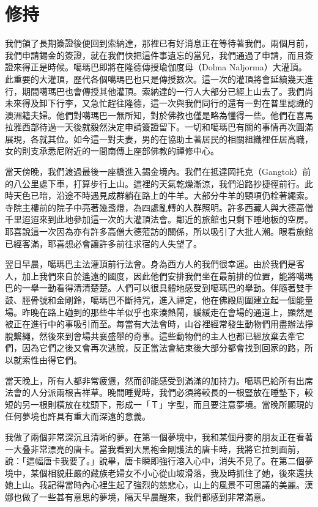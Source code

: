 \chapter{修持}

我們領了長期簽證後便回到索納達，那裡已有好消息正在等待著我們。兩個月前，我們申請錫金的簽證，就在我們快把這件事遺忘的當兒，我們通過了申請，而且簽證來得正是時候。噶瑪巴即將在隆德傳授瑜伽度母（Dolma
Naljorma）大灌頂。此重要的大灌頂，歷代各個噶瑪巴也只是傳授數次。這一次的灌頂將會延續幾天進行，期間噶瑪巴也會傳授其他灌頂。索納達的一行人大部分已經上山去了。我們尚未來得及卸下行李，又急忙趕往隆德，這一次與我們同行的還有一對在普里認識的澳洲籍夫婦。他們對噶瑪巴一無所知，對於佛教也僅是略為懂得一些。他們在喜馬拉雅西部待過一天後就毅然決定申請簽證留下。一切和噶瑪巴有關的事情再次圓滿展現，各就其位。如今這一對夫妻，男的在協助土著居民的相關組織裡任居高職，女的則支承悉尼附近的一間南傳上座部佛教的禪修中心。

當天傍晚，我們渡過最後一座橋進入錫金境內。我們在抵達岡托克（Gangtok）前的八公里處下車，打算步行上山。這裡的天氣乾燥漸涼，我們沿路抄捷徑前行。此時天色已暗，沿途不時遇見成群躺在路上的牛羊。大部分牛羊的頸項仍栓著繩索。寺院主樓前的院子中亮著幾盞燈，為四處亂轉的人群照明。許多西藏人與大德高僧千里迢迢來到此地參加這一次的大灌頂法會。鄰近的旅館也只剩下睡地板的空房。耶喜說這一次因為亦有許多高僧大德蒞訪的關係，所以吸引了大批人潮。眼看旅館已經客滿，耶喜想必會讓許多前往求宿的人失望了。

翌日早晨，噶瑪巴主法灌頂前行法會。身為西方人的我們很幸運。由於我們是客人，加上我們來自於遙遠的國度，因此他們安排我們坐在最前排的位置，能將噶瑪巴的一舉一動看得清清楚楚。人們可以很具體地感受到噶瑪巴的舉動。伴隨著雙手鼓、脛骨號和金剛鈴，噶瑪巴不斷持咒，進入禪定，他在佛殿周圍建立起一個能量場。昨晚在路上碰到的那些牛羊似乎也來湊熱鬧，緩緩走在會場的通道上，顯然是被正在進行中的事吸引而至。每當有大法會時，山谷裡經常發生動物們用盡辦法掙脫繫繩，然後來到會場共襄盛舉的奇事。這些動物們的主人也都已經放棄去牽它們，因為它們之後又會再次逃脫，反正當法會結束後大部分都會找到回家的路，所以就索性由得它們。

當天晚上，所有人都非常疲憊，然而卻能感受到滿滿的加持力。噶瑪巴給所有出席法會的人分派兩根吉祥草。晚間睡覺時，我們必須將較長的一根豎放在睡墊下，較短的另一根則橫放在枕頭下，形成一「Ｔ」字型，而且要注意夢境。當晚所顯現的任何夢境也許具有重大而深遠的意義。

我做了兩個非常深沉且清晰的夢。在第一個夢境中，我和某個丹麥的朋友正在看著一大叠非常漂亮的唐卡。當我看到大黑袍金剛護法的唐卡時，我將它拉到面前，說：「這幅唐卡我要了。」說畢，唐卡瞬即強行溶入心中，消失不見了。在第二個夢境中，某個相貌莊嚴的藏族老婦女不小心從山坡滑落，我及時抓住了她，後來還扶她上山。我記得當時內心裡生起了強烈的慈悲心，山上的風景不可思議的美麗。漢娜也做了一些甚有意思的夢境，隔天早晨醒來，我們都感到非常滿意。


